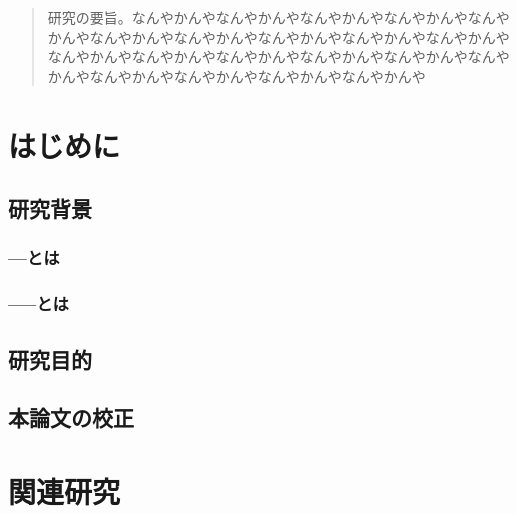 \documentclass[12pt,a4j]{jreport}
\begin{document}
\thispagestyle{empty}

\thispagestyle{empty}
\clearpage


\renewcommand{\abstractname}{要旨}

\begin{abstract}
  研究の要旨。なんやかんやなんやかんやなんやかんやなんやかんやなんやかんやなんやかんやなんやかんやなんやかんやなんやかんやなんやかんやなんやかんやなんやかんやなんやかんやなんやかんやなんやかんやなんやかんやなんやかんやなんやかんやなんやかんやなんやかんや
\end{abstract}


\tableofcontents

\pagestyle{fancy}
\lhead{\rightmark}
\renewcommand{\chaptermark}[1]{\markboth{第\ \normalfont\thechapter\ 章~~#1}{}}

\chapter{はじめに} %


\section{研究背景} %
\subsection{---とは} %
\subsection{-----とは} %

\section{研究目的}

\section{本論文の校正}


\chapter{関連研究}
\end{document}
